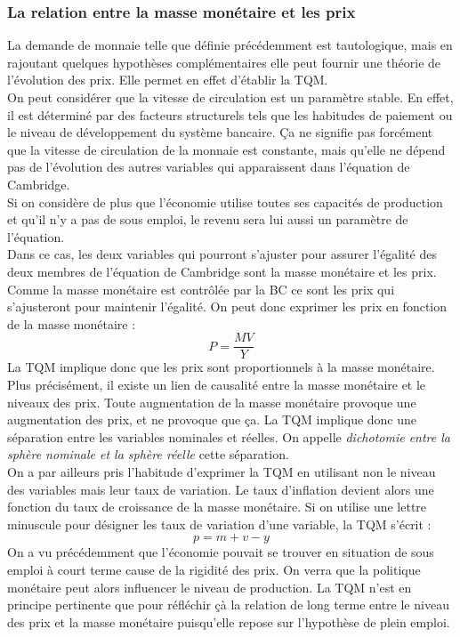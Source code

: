 \documentclass[10pt]{book}
\begin{document}
\subsubsection{La relation entre la masse monétaire et les prix}
La demande de monnaie telle que définie précédemment est tautologique, mais en rajoutant  quelques hypothèses complémentaires elle peut fournir une théorie de l'évolution des prix. Elle permet en effet d'établir la TQM. \\
On peut considérer que la vitesse de circulation est un paramètre stable. En effet, il est déterminé par des facteurs structurels tels que les habitudes de paiement ou le niveau de développement du système bancaire. Ça ne signifie pas forcément que la vitesse de circulation de la monnaie est constante, mais qu'elle ne dépend pas de l'évolution des autres variables qui apparaissent dans l'équation de Cambridge. \\
Si on considère de plus que l'économie utilise toutes ses capacités de production et qu'il n'y a pas de sous emploi, le revenu sera lui aussi un paramètre de l'équation.\\
Dans ce cas, les deux variables qui pourront s'ajuster pour assurer l'égalité des deux membres de l'équation de Cambridge sont la masse monétaire et les prix. Comme la masse monétaire est contrôlée par la BC ce sont les prix qui s'ajusteront pour maintenir l'égalité. On peut donc exprimer les prix en fonction de la masse monétaire :
$$ P = \frac{MV}{Y} $$
La TQM implique donc que les prix sont proportionnels à la masse monétaire. Plus précisément, il existe un lien de causalité entre la masse monétaire et le niveaux des prix. Toute augmentation de la masse monétaire provoque une augmentation des prix, et ne provoque que ça. La TQM implique donc une séparation entre les variables nominales et réelles. On appelle \textit{dichotomie entre la sphère nominale et la sphère réelle} cette séparation. \\
On a par ailleurs pris l'habitude d'exprimer la TQM en utilisant non le niveau des variables mais leur taux de variation. Le taux d'inflation devient alors une fonction du taux de croissance de la masse monétaire. Si on utilise une lettre minuscule pour désigner les taux de variation d'une variable, la TQM s'écrit :
$$ p = m + v - y$$
On a vu précédemment que l'économie pouvait se trouver en situation de sous emploi à court terme  cause de la rigidité des prix. On verra que la politique monétaire peut alors influencer le niveau de production. La TQM n'est en principe pertinente que pour réfléchir çà la relation de long terme entre le niveau des prix et la masse monétaire puisqu'elle repose sur l'hypothèse de plein emploi. \\
\end{document}
